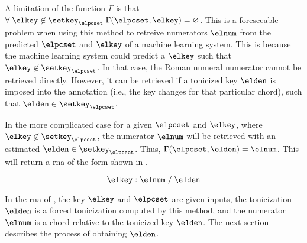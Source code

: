 A limitation of the function $\Gamma$ is that $\forall \;
\elkey \not\in \setkey_\elpcset \; \Gamma(\elpcset, \elkey)
= \varnothing$. This is a foreseeable problem when using
this method to retreive numerators $\elnum$ from the
predicted $\elpcset$ and $\elkey$ of a machine learning
system. This is because the machine learning system could
predict a $\elkey$ such that $\elkey \not\in
\setkey_\elpcset$. In that case, the Roman numeral numerator
cannot be retrieved directly. However, it can be retrieved
if a tonicized key $\elden$ is imposed into the annotation
(i.e., the key changes for that particular chord), such that
$\elden \in \setkey_\elpcset$.

In the more complicated case for a given $\elpcset$ and
$\elkey$, where $\elkey \not\in \setkey_\elpcset$, the
numerator $\elnum$ will be retrieved with an estimated
$\elden \in \setkey_\elpcset$. Thus, $\Gamma(\elpcset,
\elden) = \elnum$. This will return a \gls{rna} of the form
shown in .

\begin{equation}
    \label{eq:numerator_from_pcset_den}
    \elkey \; \text{:} \; \elnum \; \text{/} \; \elden
\end{equation}

In the \gls{rna} of , the
key $\elkey$ and $\elpcset$ are given inputs, the
tonicization $\elden$ is a forced tonicization computed by
this method, and the numerator $\elnum$ is a chord relative
to the tonicized key $\elden$. The next section describes
the process of obtaining $\elden$.
